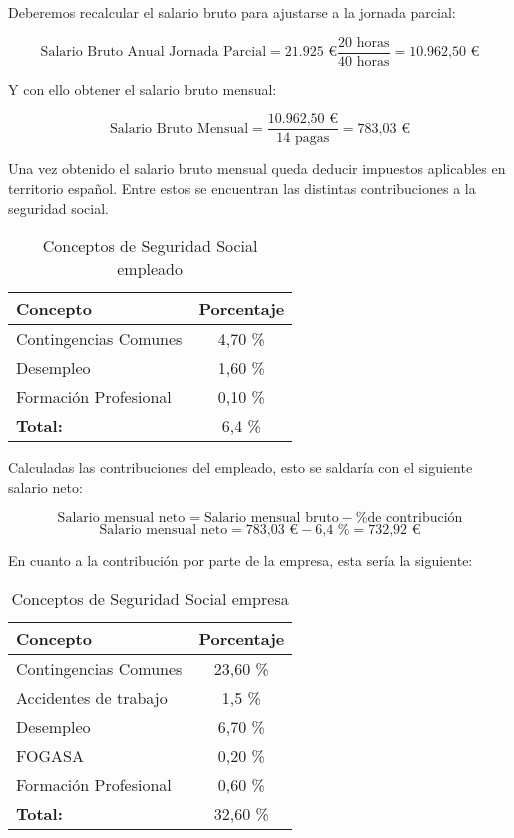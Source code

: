 Deberemos recalcular el salario bruto para ajustarse a la jornada parcial:

\[
\text{Salario Bruto Anual Jornada Parcial} = \text{21.925 €}  \frac{\text{20 horas}}{\text{40 horas}} = \text{10.962,50 €}
\]

Y con ello obtener el salario bruto mensual:

\[
\text{Salario Bruto Mensual} = \frac{\text{10.962,50 €}}{\text{14 pagas}} = \text{783,03 €}
\]

Una vez obtenido el salario bruto mensual queda deducir impuestos aplicables en territorio español. Entre estos se encuentran las distintas contribuciones a la seguridad social.


\begin{table}[h!]
	\centering
	\begin{tabular}{| l | c |}
		\toprule
		\textbf{Concepto} & \textbf{Porcentaje} \\ \midrule
		Contingencias Comunes & 4,70 \%\\
		Desempleo & 1,60 \% \\
		Formación Profesional & 0,10 \% \\
		\midrule
		\textbf{Total:} & 6,4 \% \\
		\bottomrule
	\end{tabular}
	\caption{Conceptos de Seguridad Social empleado}
	\label{SSemp}
\end{table}

Calculadas las contribuciones del empleado, esto se saldaría con el siguiente salario neto:

\[
\text{Salario mensual neto} = \text{Salario mensual bruto} - \text{\% de contribución}
\]
\[
\text{Salario mensual neto} = \text{783,03 €} - \text{6,4 \%} = \text{732,92 €}
\]

En cuanto a la contribución por parte de la empresa, esta sería la siguiente:

\begin{table}[h!]
	\centering
	\begin{tabular}{| l | c |}
		\toprule
		\textbf{Concepto} & \textbf{Porcentaje} \\ \midrule
		Contingencias Comunes & 23,60 \%\\
		Accidentes de trabajo & 1,5 \%\\
		Desempleo & 6,70 \% \\
		FOGASA & 0,20 \%\\
		Formación Profesional & 0,60 \% \\
		\midrule
		\textbf{Total:} & 32,60 \% \\
		\bottomrule
	\end{tabular}
	\caption{Conceptos de Seguridad Social empresa}
	\label{SSempresa}
\end{table}

